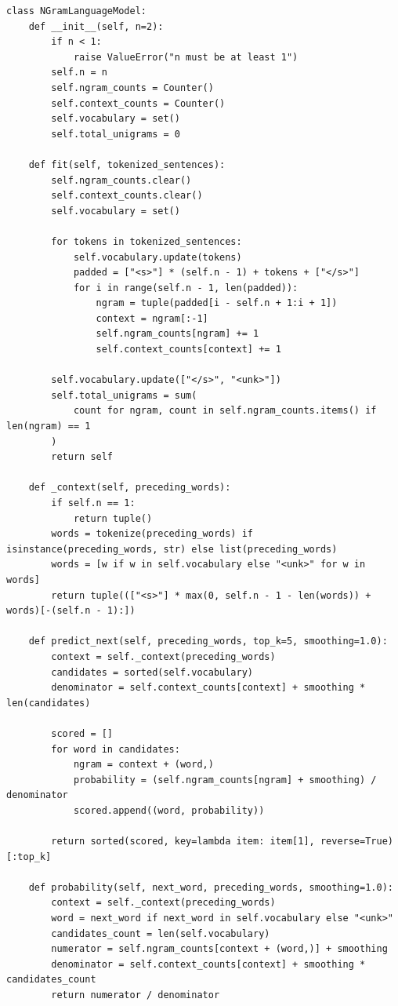 \documentclass[12pt,a4paper,oneside]{report}
\begin{document}
\begin{Verbatim}[commandchars=\\\{\},breaklines=true,breakanywhere=true,fontsize=\scriptsize,frame=leftline,framesep=2mm,rulecolor=\color{gray}]
class NGramLanguageModel:
    def __init__(self, n=2):
        if n < 1:
            raise ValueError("n must be at least 1")
        self.n = n
        self.ngram_counts = Counter()
        self.context_counts = Counter()
        self.vocabulary = set()
        self.total_unigrams = 0

    def fit(self, tokenized_sentences):
        self.ngram_counts.clear()
        self.context_counts.clear()
        self.vocabulary = set()

        for tokens in tokenized_sentences:
            self.vocabulary.update(tokens)
            padded = ["<s>"] * (self.n - 1) + tokens + ["</s>"]
            for i in range(self.n - 1, len(padded)):
                ngram = tuple(padded[i - self.n + 1:i + 1])
                context = ngram[:-1]
                self.ngram_counts[ngram] += 1
                self.context_counts[context] += 1

        self.vocabulary.update(["</s>", "<unk>"])
        self.total_unigrams = sum(
            count for ngram, count in self.ngram_counts.items() if len(ngram) == 1
        )
        return self

    def _context(self, preceding_words):
        if self.n == 1:
            return tuple()
        words = tokenize(preceding_words) if isinstance(preceding_words, str) else list(preceding_words)
        words = [w if w in self.vocabulary else "<unk>" for w in words]
        return tuple((["<s>"] * max(0, self.n - 1 - len(words)) + words)[-(self.n - 1):])

    def predict_next(self, preceding_words, top_k=5, smoothing=1.0):
        context = self._context(preceding_words)
        candidates = sorted(self.vocabulary)
        denominator = self.context_counts[context] + smoothing * len(candidates)

        scored = []
        for word in candidates:
            ngram = context + (word,)
            probability = (self.ngram_counts[ngram] + smoothing) / denominator
            scored.append((word, probability))

        return sorted(scored, key=lambda item: item[1], reverse=True)[:top_k]

    def probability(self, next_word, preceding_words, smoothing=1.0):
        context = self._context(preceding_words)
        word = next_word if next_word in self.vocabulary else "<unk>"
        candidates_count = len(self.vocabulary)
        numerator = self.ngram_counts[context + (word,)] + smoothing
        denominator = self.context_counts[context] + smoothing * candidates_count
        return numerator / denominator


\end{Verbatim}
\end{document}

